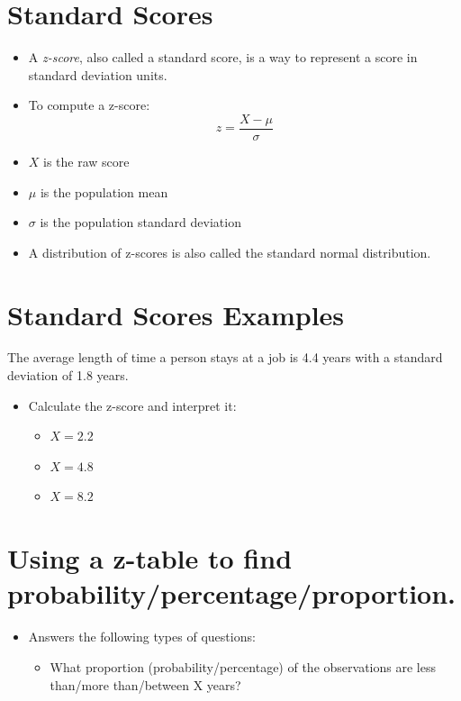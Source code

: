 \documentclass[12pt]{article}
\begin{document}
\section{Standard Scores}\label{standard-scores}

\begin{itemize}
\item
  A \emph{z-score}, also called a standard score, is a way to represent
  a score in standard deviation units.
\item
  To compute a z-score: \[ z = \frac{X - \mu}{\sigma} \]
\item
  \(X\) is the raw score
\item
  \(\mu\) is the population mean
\item
  \(\sigma\) is the population standard deviation
\item
  A distribution of z-scores is also called the standard normal
  distribution.
\end{itemize}

\section{Standard Scores Examples}\label{standard-scores-examples}

The average length of time a person stays at a job is 4.4 years with a
standard deviation of 1.8 years.

\begin{itemize}
\itemsep1pt\parskip0pt
\item
  Calculate the z-score and interpret it:

  \begin{itemize}
  \itemsep1pt\parskip0pt
  \item
    \(X = 2.2\)
  \item
    \(X = 4.8\)
  \item
    \(X = 8.2\)
  \end{itemize}
\end{itemize}

\section{Using a z-table to find
probability/percentage/proportion.}\label{using-a-z-table-to-find-probabilitypercentageproportion.}

\begin{itemize}
\itemsep1pt\parskip0pt
\item
  Answers the following types of questions:

  \begin{itemize}
  \itemsep1pt\parskip0pt
  \item
    What proportion (probability/percentage) of the observations are
    less than/more than/between X years?
  \end{itemize}
\end{itemize}
\end{document}
